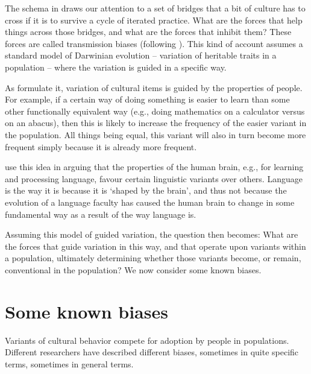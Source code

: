 The schema in  draws our attention to a set of bridges that a bit 
of culture has to cross if it is to survive a cycle of iterated 
practice. What are the forces that help things across those 
bridges, and what are the forces that inhibit them? These forces are 
called transmission biases (following \citealt{boyd_culture_1985,boyd_origin_2005}). 
This kind of account assumes a standard model of Darwinian 
evolution -- variation of heritable traits in a population -- where 
the variation is guided in a specific way. 



As \citet{boyd_culture_1985} formulate it, variation of cultural items 
is guided by the properties of people. For example, if a certain 
way of doing something is easier to learn than some other functionally 
equivalent way (e.g., doing mathematics on a calculator versus on an abacus), 
then this is likely to increase the frequency of the easier 
variant in the population. All things being equal, this variant 
will also in turn become more frequent simply because it is already 
more frequent. 



\citet{christiansen_language_2008} use this idea in arguing that the 
properties of the human brain, e.g., for learning and 
processing language, favour certain linguistic variants over others. Language is the way it is because it is \textquoteleft shaped by the 
brain', and thus not because the evolution of a language faculty has 
caused the human brain to change in some fundamental way as a result of 
the way language is. 



Assuming this model of guided variation, the question then becomes: What 
are the forces that guide variation in this way, and that 
operate upon variants within a population, ultimately 
determining whether those variants become, or remain, conventional in the 
population? We now consider some known biases.



\section{Some known biases}
\label{someknownbiases}

Variants of cultural behavior compete for adoption by people in populations. Different researchers have described different 
biases, sometimes in quite specific terms, sometimes in general terms. 



